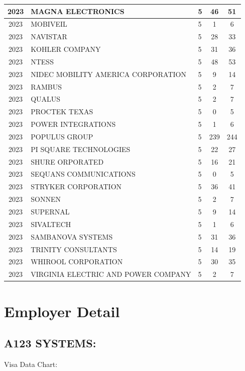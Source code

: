 \documentclass{article}%
\begin{document}
\begin{longtable}{c|p{20em}|p{5em}|c|c}
\hline%
2023&MAGNA ELECTRONICS&5&46&51\\%
\hline%
2023&MOBIVEIL&5&1&6\\%
\hline%
2023&NAVISTAR&5&28&33\\%
\hline%
2023&KOHLER COMPANY&5&31&36\\%
\hline%
2023&NTESS&5&48&53\\%
\hline%
2023&NIDEC MOBILITY AMERICA CORPORATION&5&9&14\\%
\hline%
2023&RAMBUS&5&2&7\\%
\hline%
2023&QUALUS&5&2&7\\%
\hline%
2023&PROCTEK TEXAS&5&0&5\\%
\hline%
2023&POWER INTEGRATIONS&5&1&6\\%
\hline%
2023&POPULUS GROUP&5&239&244\\%
\hline%
2023&PI SQUARE TECHNOLOGIES&5&22&27\\%
\hline%
2023&SHURE ORPORATED&5&16&21\\%
\hline%
2023&SEQUANS COMMUNICATIONS&5&0&5\\%
\hline%
2023&STRYKER CORPORATION&5&36&41\\%
\hline%
2023&SONNEN&5&2&7\\%
\hline%
2023&SUPERNAL&5&9&14\\%
\hline%
2023&SIVALTECH&5&1&6\\%
\hline%
2023&SAMBANOVA SYSTEMS&5&31&36\\%
\hline%
2023&TRINITY CONSULTANTS&5&14&19\\%
\hline%
2023&WHIROOL CORPORATION&5&30&35\\%
\hline%
2023&VIRGINIA ELECTRIC AND POWER COMPANY&5&2&7\\%
\hline%
\end{longtable}

%
\newpage

%
\section{Employer Detail}%
\label{sec:EmployerDetail}%
\subsection{A123 SYSTEMS:}%
\label{subsec:A123SYSTEMS}%
Visa Data Chart:%
\end{document}

